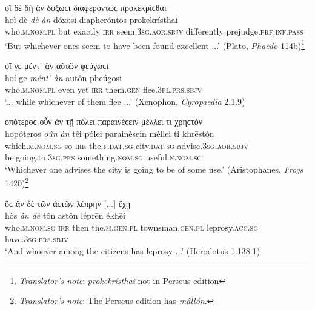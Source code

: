 \begin{exe}
\ex οἳ δὲ δὴ ἂν δόξωϲι διαφερόντωϲ προκεκρίϲθαι\\
\gll hoì dè \emph{dḕ} \emph{àn} dóxōsi diapheróntōs prokekrísthai\\
who.\textsc{m.nom.pl} but exactly \textsc{irr} seem.\textsc{3sg.aor.sbjv} differently prejudge.\textsc{prf.inf.pass}\\
\trans `But whichever ones seem to have been found excellent ...' (Plato, \textit{Phaedo} 114b)\footnote{\emph{Translator's note}: \textit{prokekrísthai} not in Perseus edition}
\label{PlatPhaedo114b}
\end{exe}

\begin{exe}
\ex οἵ γε μέντ᾽ ἂν αὐτῶν φεύγωϲι\\
\gll hoí ge \emph{mént'} \emph{àn} autôn pheúgōsi\\
who.\textsc{m.nom.pl} even yet \textsc{irr} them.\textsc{gen} flee.\textsc{3pl.prs.sbjv}\\
\trans `... while whichever of them flee ...' (Xenophon, \textit{Cyropaedia} 2.1.9)
\label{XenCyrop219}
\end{exe}

\begin{exe}
\ex ὁπότεροϲ οὖν ἂν τῇ πόλει παραινέϲειν μέλλει τι χρηϲτόν\\
\gll hopóteros \emph{oûn} \emph{àn} têi pólei parainésein méllei ti khrēstón\\
which.\textsc{m.nom.sg} so \textsc{irr} the.\textsc{f.dat.sg}
city.\textsc{dat.sg} advise.\textsc{3sg.aor.sbjv} be.going.to.\textsc{3sg.prs} something.\textsc{nom.sg} useful.\textsc{n.nom.sg}\\
\trans `Whichever one advises the city is going to be of some use.' (Aristophanes, \textit{Frogs} 1420)\footnote{\emph{Translator's note}: The Perseus edition has \textit{mâllón}.}
\label{AristophFrogs1420}
\end{exe}

\begin{exe}
\ex ὃϲ ἂν δὲ τῶν ἀϲτῶν λέπρην {[}...{]} ἔχῃ\\
\gll hòs \emph{àn} \emph{dè} tôn astôn léprēn ékhēi\\
who.\textsc{m.nom.sg} \textsc{irr} then the.\textsc{m.gen.pl} townsman.\textsc{gen.pl} leprosy.\textsc{acc.sg} have.\textsc{3sg.prs.sbjv}\\
\trans `And whoever among the citizens has leprosy ...' (Herodotus 1.138.1)
\label{Hdt11381}
\end{exe}

